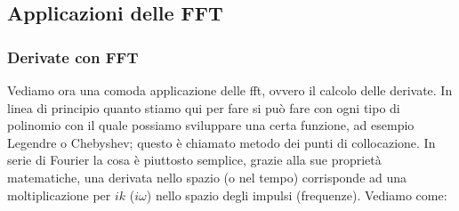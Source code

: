 \documentclass[10pt,a4paper]{article}
\begin{document}
\subsection{Applicazioni delle FFT}
\subsubsection{Derivate con FFT}
Vediamo ora una comoda applicazione delle fft, ovvero il calcolo delle derivate. In linea di principio quanto stiamo qui per fare si può fare con ogni tipo di polinomio con il quale possiamo sviluppare una certa funzione, ad esempio Legendre o Chebyshev; questo è chiamato metodo dei punti di collocazione. In serie di Fourier la cosa è piuttosto semplice, grazie alla sue proprietà matematiche, una derivata nello spazio (o nel tempo) corrisponde ad una moltiplicazione per $ik$ ($i\omega$) nello spazio degli impulsi (frequenze). Vediamo come:
\end{document}
